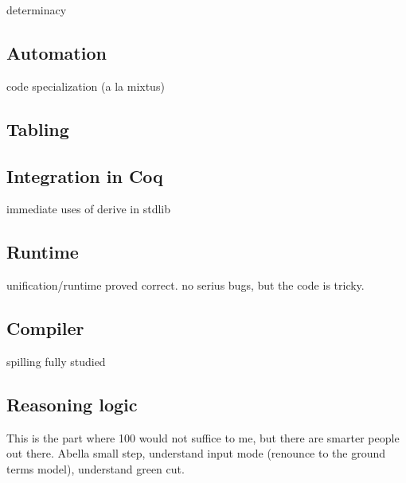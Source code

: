 \documentclass[a4paper, 11pt]{book}
\begin{document}
determinacy

\subsection{Automation}

code specialization (a la mixtus)

\subsection{Tabling}

\cite{selsam2020tabledtypeclassresolution}

\subsection{Integration in Coq}

immediate uses of derive in stdlib

\subsection{Runtime}

unification/runtime proved correct.
no serius bugs, but the code is tricky.

\subsection{Compiler}

spilling fully studied

\subsection{Reasoning logic}

This is the part where 100 would not suffice to me, but there are smarter people out there.
Abella small step, understand input mode (renounce to the ground terms model),
understand green cut.




\nocite{*}
\printbibliography[title={Our Bibliography}, keyword=me]
\printbibliography[title={Bibliography}, keyword=they]
\end{document}
